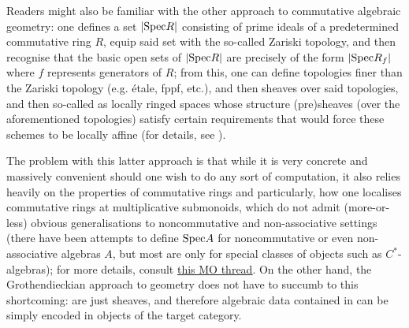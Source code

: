             Readers might also be familiar with the other approach to commutative algebraic geometry: one defines a set $|\mathrm{Spec} R|$ consisting of prime ideals of a predetermined commutative ring $R$, equip said set with the so-called Zariski topology, and then recognise that the basic open sets of $|\mathrm{Spec} R|$ are precisely of the form $|\mathrm{Spec} R_f|$ where $f$ represents generators of $R$; from this, one can define topologies finer than the Zariski topology (e.g. \'etale, fppf, etc.), and then sheaves over said topologies, and then so-called  as locally ringed spaces whose structure (pre)sheaves (over the aforementioned topologies) satisfy certain requirements that would force these schemes to be locally affine (for details, see \cite[Chapter 2]{hartshorne}). 
            
            The problem with this latter approach is that while it is very concrete and massively convenient should one wish to do any sort of computation, it also relies heavily on the properties of commutative rings and particularly, how one localises commutative rings at multiplicative submonoids, which do not admit (more-or-less) obvious generalisations to noncommutative and non-associative settings (there have been attempts to define $\mathrm{Spec} A$ for noncommutative or even non-associative algebras $A$, but most are only  for special classes of objects such as $C^*$-algebras); for more details, consult \href{https://mathoverflow.net/questions/159449/why-is-naive-definition-of-non-commutative-spectrum-bad}{\underline{this MO thread}}. On the other hand, the Grothendieckian approach to geometry does not have to succumb to this shortcoming:  are just sheaves, and therefore algebraic data contained in  can be simply encoded in objects of the target category. 
        
